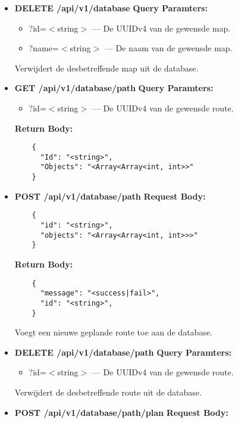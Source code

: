 \begin{enumerate}
\begin{itemize}
\begin{verbatim}
      "id": "<string>",
    }
    \end{verbatim}
    Voegt een nieuwe map toe aan de database.
    \item \textbf{DELETE /api/v1/database}
    \linebreak \textbf{Query Paramters:}
    \begin{itemize}
      \item ?id=$<$string$>$ --- De UUIDv4 van de gewensde map.
      \item ?name=$<$string$>$ --- De naam van de gewensde map.
    \end{itemize}
    Verwijdert de desbetreffende map uit de database.
    \item \textbf{GET /api/v1/database/path}
    \linebreak \textbf{Query Paramters:}
    \begin{itemize}
      \item ?id=$<$string$>$ --- De UUIDv4 van de gewensde route.
    \end{itemize}
    \textbf{Return Body:}
    \begin{verbatim}
    {
      "Id": "<string>",
      "Objects": "<Array<Array<int, int>>"
    }
    \end{verbatim}
    \item \textbf{POST /api/v1/database/path}
    \linebreak \textbf{Request Body:}
    \begin{verbatim}
    {
      "id": "<string>",
      "objects": "<Array<Array<int, int>>>"
    }
    \end{verbatim}
    \textbf{Return Body:}
    \begin{verbatim}
    {
      "message": "<success|fail>",
      "id": "<string>",
    }
    \end{verbatim}
    Voegt een nieuwe geplande route toe aan de database.
    \item \textbf{DELETE /api/v1/database/path}
    \linebreak \textbf{Query Paramters:}
    \begin{itemize}
      \item ?id=$<$string$>$ --- De UUIDv4 van de gewensde route.
    \end{itemize}
    Verwijdert de desbetreffende route uit de database.
    \item \textbf{POST /api/v1/database/path/plan}
    \linebreak \textbf{Request Body:}

\end{itemize}
\end{enumerate}
